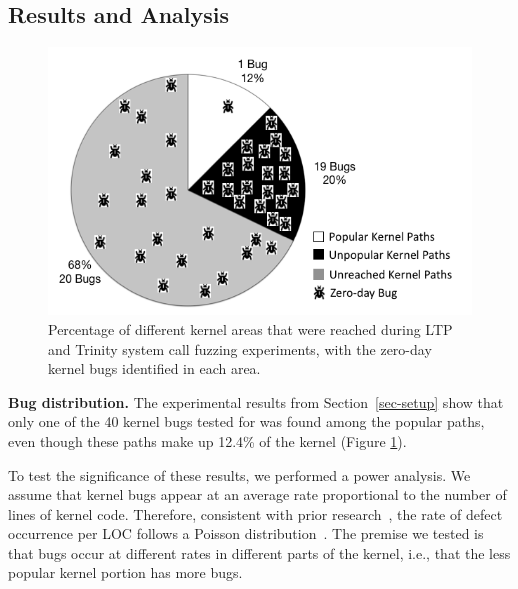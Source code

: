 \subsection{Results and Analysis}
\label{Verification-of-Hypothesis}
\begin{figure}
\centering
\includegraphics[width=1.0\columnwidth]{diagram/popular_paths.png}
\caption{\small Percentage of different kernel areas that were reached during
 LTP and Trinity system call fuzzing experiments, with the zero-day kernel bugs identified
 in each area.}
\label{fig:coverage}
\end{figure}

\noindent
{\bf Bug distribution.}
The experimental results from Section~\ref{sec-setup} show that only one of the 40 kernel bugs
tested for was found among the popular paths, even though these paths make up 12.4\% of the kernel
(Figure \ref{fig:coverage}).

To test the significance of these results, we performed a power analysis.
%
We assume that kernel bugs appear at an average rate proportional to the
number of lines of kernel code.
Therefore, consistent with prior research~\cite{mayer1989probability},
the rate of defect occurrence per LOC follows a Poisson
distribution~\cite{Poisson-distribution}.
The premise we tested is that bugs occur at different rates in different
parts of the kernel, i.e., that the less popular kernel portion has more bugs.

